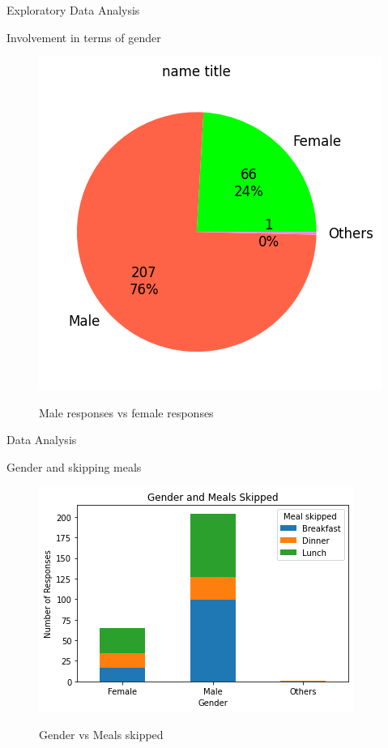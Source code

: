 \documentclass{beamer}
\begin{document}
\begin{frame}{Exploratory Data Analysis}
\begin{block}{Involvement in terms of gender}
\begin{figure}
      \centering
    \caption{Male responses vs female responses}
    \includegraphics[scale = 0.55]{pie_gender.png}  
    \label{fig:side-by-side}
\end{figure}
\end{block}
\end{frame}
\begin{frame}{Data Analysis}
\begin{block}{Gender and skipping meals}
\begin{figure}
      \centering
    \caption{Gender vs Meals skipped }
    \includegraphics[scale = 0.55]{Meal Skipping - Gender Seg chart.png}  
    \label{gender_seg}
\end{figure}
\end{block}
\end{frame}
\end{document}
